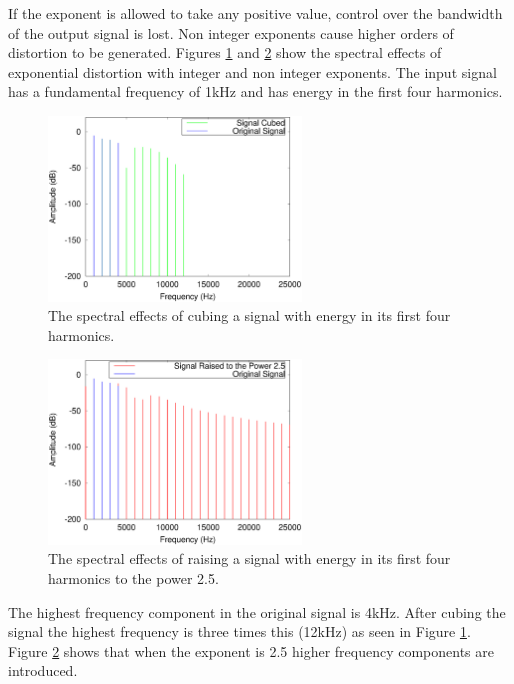 			If the exponent is allowed to take any positive value, control over the bandwidth of the output
			signal is lost. Non integer exponents cause higher orders of distortion to be generated. Figures
			\ref{fig:CubedSpectra} and \ref{fig:TwoAndAHalfSpectra} show the spectral effects of exponential
			distortion with integer and non integer exponents. The input signal has a fundamental frequency of
			1kHz and has energy in the first four harmonics.

			\begin{figure}[h!]
				\centering
				\includegraphics[width=0.6\textwidth]{chapter3/Images/CubedSpectra.eps}
				\caption{The spectral effects of cubing a signal with energy in its first four harmonics.}
				\label{fig:CubedSpectra}
			\end{figure}

			\begin{figure}[h!]
				\centering
				\includegraphics[width=0.6\textwidth]{chapter3/Images/RaisedToTwoAndAHalfSpectra.eps}
				\caption{The spectral effects of raising a signal with energy in its first four harmonics
					 to the power 2.5.}
				\label{fig:TwoAndAHalfSpectra}
			\end{figure}

			The highest frequency component in the original signal is 4kHz. After cubing the signal the highest
			frequency is three times this (12kHz) as seen in Figure \ref{fig:CubedSpectra}. Figure
			\ref{fig:TwoAndAHalfSpectra} shows that when the exponent is 2.5 higher frequency components are
			introduced. 

